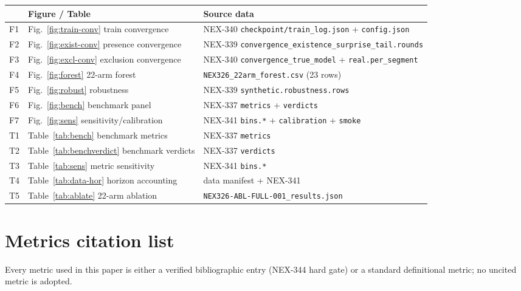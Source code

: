 \documentclass[11pt]{article}
\begin{document}
\begin{center}
\begin{tabular}{p{0.6cm}p{4.4cm}p{5.6cm}}
\toprule
 & Figure / Table & Source data \\
\midrule
F1 & Fig.~\ref{fig:train-conv} train convergence & NEX-340 \texttt{checkpoint/train\_log.json} + \texttt{config.json} \\
F2 & Fig.~\ref{fig:exist-conv} presence convergence & NEX-339 \texttt{convergence\_existence\_surprise\_tail.rounds} \\
F3 & Fig.~\ref{fig:excl-conv} exclusion convergence & NEX-340 \texttt{convergence\_true\_model} + \texttt{real.per\_segment} \\
F4 & Fig.~\ref{fig:forest} 22-arm forest & \texttt{NEX326\_22arm\_forest.csv} (23 rows) \\
F5 & Fig.~\ref{fig:robust} robustness & NEX-339 \texttt{synthetic.robustness.rows} \\
F6 & Fig.~\ref{fig:bench} benchmark panel & NEX-337 \texttt{metrics} + \texttt{verdicts} \\
F7 & Fig.~\ref{fig:sens} sensitivity/calibration & NEX-341 \texttt{bins.*} + \texttt{calibration} + \texttt{smoke} \\
T1 & Table~\ref{tab:bench} benchmark metrics & NEX-337 \texttt{metrics} \\
T2 & Table~\ref{tab:benchverdict} benchmark verdicts & NEX-337 \texttt{verdicts} \\
T3 & Table~\ref{tab:sens} metric sensitivity & NEX-341 \texttt{bins.*} \\
T4 & Table~\ref{tab:data-hor} horizon accounting & data manifest + NEX-341 \\
T5 & Table~\ref{tab:ablate} 22-arm ablation & \texttt{NEX326-ABL-FULL-001\_results.json} \\
\bottomrule
\end{tabular}
\end{center}

\section{Metrics citation list}
\label{app:metrics}
Every metric used in this paper is either a verified bibliographic entry
(NEX-344 hard gate) or a standard definitional metric; no uncited metric is
adopted.
\end{document}
